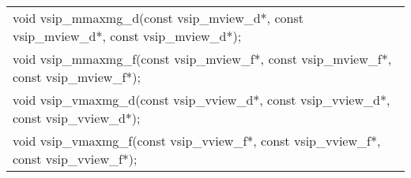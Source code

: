 \\\cvsiplh
\afh
{
\ttfamily
\\\hspace*{.04\textwidth}\begin{tabular}[H]{l}
void vsip\_mmaxmg\_d(const vsip\_mview\_d*, const vsip\_mview\_d*, const vsip\_mview\_d*);\\
void vsip\_mmaxmg\_f(const vsip\_mview\_f*, const vsip\_mview\_f*, const vsip\_mview\_f*);\\
void vsip\_vmaxmg\_d(const vsip\_vview\_d*, const vsip\_vview\_d*, const vsip\_vview\_d*);\\
void vsip\_vmaxmg\_f(const vsip\_vview\_f*, const vsip\_vview\_f*, const vsip\_vview\_f*);\\
\end{tabular}
}
\\\pyjvsiph
%
%
%
